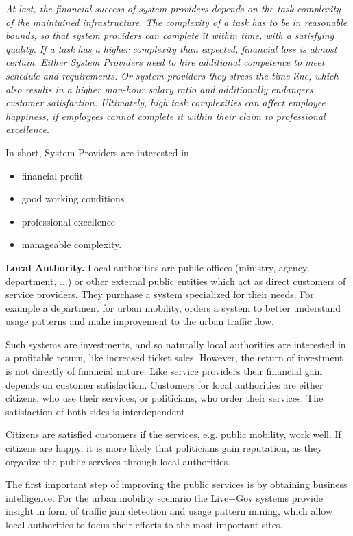 \documentclass[runningheads,a4paper]{llncs}
\newenvironment{LGContent}
{ \par\color{blue} \it \small }
{ \par }
\begin{document}
\begin{LGContent}
At last, the financial success of system providers depends on the task complexity of the maintained infrastructure.
The complexity of a task has to be in reasonable bounds, so that system providers can complete it within time, with a satisfying quality.
If a task has a higher complexity than expected, financial loss is almost certain.
Either System Providers need to hire additional competence to meet schedule and requirements.
Or system providers they stress the time-line, which also results in a higher man-hour salary ratio and additionally endangers customer satisfaction.
Ultimately, high task complexities can affect employee happiness, if employees cannot complete it within their claim to professional excellence.

In short, System Providers are interested in
\begin{itemize}
\item financial profit
\item good working conditions
\item professional excellence
\item manageable complexity.
\end{itemize}


\textbf{Local Authority.}
Local authorities are public offices (ministry, agency, department, ...) or other external public entities which act as direct customers of service providers.
They purchase a system specialized for their needs.
For example a department for urban mobility, orders a system to better understand usage patterns and make improvement to the urban traffic flow.

Such systems are investments, and so naturally local authorities are interested in a profitable return, like increased ticket sales.
However, the return of investment is not directly of financial nature.
Like service providers their financial gain depends on customer satisfaction.
Customers for local authorities are either citizens, who use their services, or politicians, who order their services.
The satisfaction of both sides is interdependent.

Citizens are satisfied customers if the services, e.g. public mobility, work well.
If citizens are happy, it is more likely that politicians gain reputation, as they organize the public services through local authorities.

The first important step of improving the public services is by obtaining business intelligence.
For the urban mobility scenario the Live+Gov systems provide insight in form of traffic jam detection and usage pattern mining, which allow local authorities to focus their efforts to the most important sites.


\end{LGContent}
\end{document}
